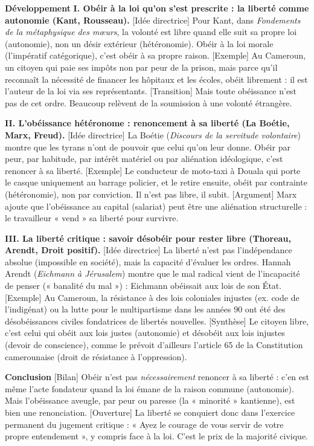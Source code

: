 \documentclass[11pt]{article}
\begin{document}
\begin{exoresolu}
\textbf{Développement}
\textbf{I. Obéir à la loi qu'on s'est prescrite : la liberté comme autonomie (Kant, Rousseau).}
[Idée directrice] Pour Kant, dans \emph{Fondements de la métaphysique des mœurs}, la volonté est libre quand elle suit sa propre loi (autonomie), non un désir extérieur (hétéronomie). Obéir à la loi morale (l'impératif catégorique), c'est obéir à sa propre raison. [Exemple] Au Cameroun, un citoyen qui paie ses impôts non par peur de la prison, mais parce qu'il reconnaît la nécessité de financer les hôpitaux et les écoles, obéit librement : il est l'auteur de la loi via ses représentants.
[Transition] Mais toute obéissance n'est pas de cet ordre. Beaucoup relèvent de la soumission à une volonté étrangère.

\textbf{II. L'obéissance hétéronome : renoncement à sa liberté (La Boétie, Marx, Freud).}
[Idée directrice] La Boétie (\emph{Discours de la servitude volontaire}) montre que les tyrans n'ont de pouvoir que celui qu'on leur donne. Obéir par peur, par habitude, par intérêt matériel ou par aliénation idéologique, c'est renoncer à sa liberté. [Exemple] Le conducteur de moto-taxi à Douala qui porte le casque uniquement au barrage policier, et le retire ensuite, obéit par contrainte (hétéronomie), non par conviction. Il n'est pas libre, il subit. [Argument] Marx ajoute que l'obéissance au capital (salariat) peut être une aliénation structurelle : le travailleur « vend » sa liberté pour survivre.

\textbf{III. La liberté critique : savoir désobéir pour rester libre (Thoreau, Arendt, Droit positif).}
[Idée directrice] La liberté n'est pas l'indépendance absolue (impossible en société), mais la capacité d'évaluer les ordres. Hannah Arendt (\emph{Eichmann à Jérusalem}) montre que le mal radical vient de l'incapacité de penser (« banalité du mal ») : Eichmann obéissait aux lois de son État. [Exemple] Au Cameroun, la résistance à des lois coloniales injustes (ex. code de l'indigénat) ou la lutte pour le multipartisme dans les années 90 ont été des désobéissances civiles fondatrices de libertés nouvelles. [Synthèse] Le citoyen libre, c'est celui qui obéit aux lois justes (autonomie) et désobéit aux lois injustes (devoir de conscience), comme le prévoit d'ailleurs l'article 65 de la Constitution camerounaise (droit de résistance à l'oppression).

\textbf{Conclusion}
[Bilan] Obéir n'est pas \emph{nécessairement} renoncer à sa liberté : c'en est même l'acte fondateur quand la loi émane de la raison commune (autonomie). Mais l'obéissance aveugle, par peur ou paresse (la « minorité » kantienne), est bien une renonciation. [Ouverture] La liberté se conquiert donc dans l'exercice permanent du jugement critique : « Ayez le courage de vous servir de votre propre entendement », y compris face à la loi. C'est le prix de la majorité civique.

\end{exoresolu}
\end{document}

